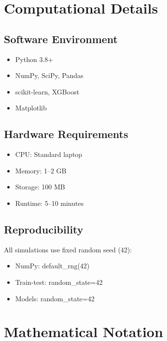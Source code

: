 \documentclass[11pt,a4paper]{article}
\begin{document}
\newpage
\appendix

\section{Computational Details}

\subsection{Software Environment}
\begin{itemize}
    \item Python 3.8+
    \item NumPy, SciPy, Pandas
    \item scikit-learn, XGBoost
    \item Matplotlib
\end{itemize}

\subsection{Hardware Requirements}
\begin{itemize}
    \item CPU: Standard laptop
    \item Memory: 1--2 GB
    \item Storage: 100 MB
    \item Runtime: 5--10 minutes
\end{itemize}

\subsection{Reproducibility}

All simulations use fixed random seed (42):
\begin{itemize}
    \item NumPy: default\_rng(42)
    \item Train-test: random\_state=42
    \item Models: random\_state=42
\end{itemize}

\section{Mathematical Notation}
\end{document}

